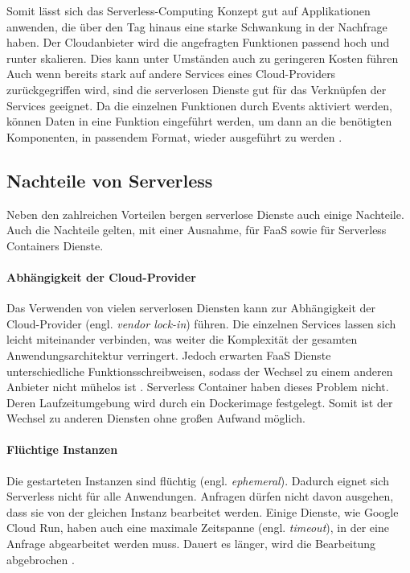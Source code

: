 Somit lässt sich das Serverless-Computing Konzept gut auf Applikationen anwenden,
die über den Tag hinaus eine starke Schwankung in der Nachfrage haben. Der Cloudanbieter wird
die angefragten Funktionen passend hoch und runter skalieren.
Dies kann unter Umständen auch zu geringeren Kosten führen 
Auch wenn bereits stark auf 
andere Services eines Cloud-Providers zurückgegriffen wird, sind die serverlosen Dienste
gut für das Verknüpfen der Services geeignet. Da die einzelnen Funktionen durch Events
aktiviert werden, können Daten in eine Funktion eingeführt werden, um
dann an die benötigten Komponenten, in passendem Format, wieder ausgeführt zu werden
\cite{ServerlessTrends} \cite{HpcServerless}.

\subsection{Nachteile von Serverless}
Neben den zahlreichen Vorteilen bergen serverlose Dienste auch einige Nachteile.
Auch die Nachteile gelten, mit einer Ausnahme, für FaaS sowie für
Serverless Containers Dienste.

\paragraph{Abhängigkeit der Cloud-Provider} Das Verwenden von vielen serverlosen Diensten kann zur Abhängigkeit der
Cloud-Provider (engl. \emph{vendor lock-in}) führen. Die einzelnen
Services lassen sich leicht miteinander verbinden,
was weiter die Komplexität der gesamten Anwendungsarchitektur verringert. Jedoch erwarten
FaaS Dienste unterschiedliche Funktionsschreibweisen, sodass der Wechsel zu einem
anderen Anbieter nicht mühelos ist \cite{EcoArc}.
Serverless Container haben dieses Problem nicht.
Deren Laufzeitumgebung wird durch ein Dockerimage festgelegt.
Somit ist der Wechsel zu anderen Diensten ohne großen Aufwand
möglich.

\paragraph{Flüchtige Instanzen} Die gestarteten Instanzen sind flüchtig (engl. \emph{ephemeral}). Dadurch
eignet sich Serverless nicht für alle Anwendungen. Anfragen dürfen nicht davon ausgehen, dass sie von der
gleichen Instanz bearbeitet werden. Einige Dienste, wie Google Cloud Run,
haben auch eine maximale Zeitspanne (engl. \emph{timeout}), in der eine Anfrage abgearbeitet werden muss.
Dauert es länger, wird die Bearbeitung abgebrochen \cite{CloudRunTimeout}.

